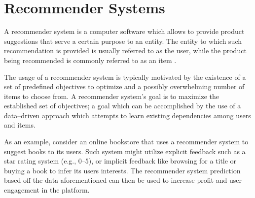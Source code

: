 \section{Recommender Systems} \label{sect:intro:recommender-systems}

A recommender system is a computer software which allows to provide product suggestions that serve a certain purpose to an entity. The entity to which such recommendation is provided is usually referred to as the user, while the product being recommended is commonly referred to as an item \cite{book:rs}. \newline

The usage of a recommender system is typically motivated by the existence of a set of predefined objectives to optimize and a possibly overwhelming number of items to choose from. A recommender system's goal is to maximize the established set of objectives; a goal which can be accomplished by the use of a data--driven approach which attempts to learn existing dependencies among users and items.  \newline

As an example, consider an online bookstore that uses a recommender system to suggest books to its users. Such system might utilize explicit feedback such as a star rating system (e.g., 0--5), or implicit feedback like browsing for a title or buying a book to infer its users interests. The recommender system prediction based off the data aforementioned can then be used to increase profit and user engagement in the platform.